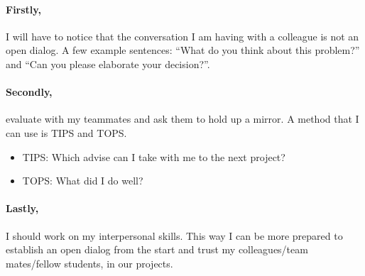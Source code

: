 \documentclass[11pt]{article}
\begin{document}
	\paragraph{Firstly,} I will have to notice that the conversation I am having with a colleague is not an open dialog. A few example sentences: ``What do you think about this problem?'' and ``Can you please elaborate your decision?''. 
	
	\paragraph{Secondly,} evaluate with my teammates and ask them to hold up a mirror. A method that I can use is TIPS and TOPS.
	\begin{itemize}
		\item TIPS: Which advise can I take with me to the next project?
		\item TOPS: What did I do well?
	\end{itemize} 

	\paragraph{Lastly,} I should work on my interpersonal skills. This way I can be more prepared to establish an open dialog from the start and trust my colleagues/team mates/fellow students, in our projects.
	
	
	
	
	
	
	
	
	
	
	
	
	
\end{document}
